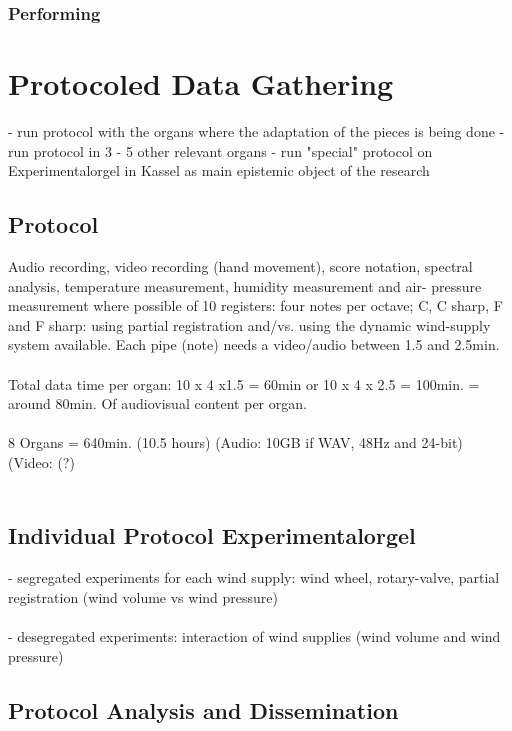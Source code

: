 \subsubsection{Performing} 

\section{Protocoled Data Gathering}

- run protocol with the organs where the adaptation of the pieces is being done
- run protocol in 3 - 5 other relevant organs
- run "special" protocol on Experimentalorgel in Kassel as main epistemic object of the research 

\subsection{Protocol} 

Audio recording, video recording (hand movement), score notation, spectral analysis, temperature measurement, humidity measurement and air- pressure measurement where possible  of 10 registers: four notes per octave; C, C sharp, F and F sharp: using partial registration and/vs. using the dynamic wind-supply system available.
Each pipe (note) needs a video/audio between 1.5 and 2.5min. \\
\\
Total data time per organ: 10 x 4 x1.5 = 60min or 10 x 4 x 2.5 = 100min. = around 80min. Of audiovisual content per organ. \\
\\
8 Organs = 640min. (10.5 hours) (Audio: 10GB if WAV, 48Hz and 24-bit) (Video: (?)\\
\\
\subsection{Individual Protocol Experimentalorgel}

- segregated experiments for each wind supply: wind wheel, rotary-valve, partial registration (wind volume vs wind pressure)\\
\\
- desegregated experiments: interaction of wind supplies (wind volume and wind pressure)

\subsection{Protocol Analysis and Dissemination}

